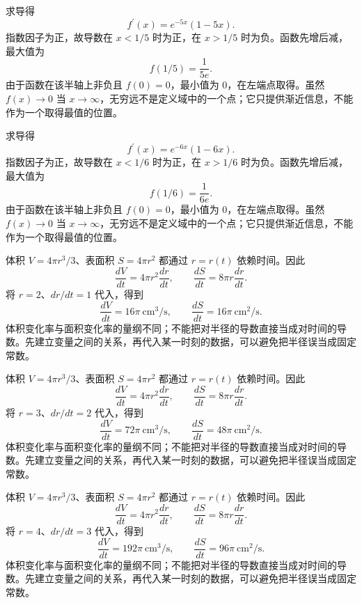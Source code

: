 \documentclass[12pt,fontset=fandol]{ctexart}
\begin{document}
\begin{solve}\label{ans:c11q18}
求导得
\[
f^{\prime}(x)=e^{-5x}(1-5x).
\]
指数因子为正，故导数在 $x<1/5$ 时为正，在 $x>1/5$ 时为负。函数先增后减，最大值为
\[
f(1/5)=\frac1{5e}.
\]
由于函数在该半轴上非负且 $f(0)=0$，最小值为 $0$，在左端点取得。虽然 $f(x)\to0$ 当 $x\to\infty$，无穷远不是定义域中的一个点；它只提供渐近信息，不能作为一个取得最值的位置。
\end{solve}

\begin{solve}\label{ans:c11q19}
求导得
\[
f^{\prime}(x)=e^{-6x}(1-6x).
\]
指数因子为正，故导数在 $x<1/6$ 时为正，在 $x>1/6$ 时为负。函数先增后减，最大值为
\[
f(1/6)=\frac1{6e}.
\]
由于函数在该半轴上非负且 $f(0)=0$，最小值为 $0$，在左端点取得。虽然 $f(x)\to0$ 当 $x\to\infty$，无穷远不是定义域中的一个点；它只提供渐近信息，不能作为一个取得最值的位置。
\end{solve}

\begin{solve}\label{ans:c11q20}
体积 $V=4\pi r^3/3$、表面积 $S=4\pi r^2$ 都通过 $r=r(t)$ 依赖时间。因此
\[
\frac{dV}{dt}=4\pi r^2\frac{dr}{dt},\qquad\frac{dS}{dt}=8\pi r\frac{dr}{dt}.
\]
将 $r=2$、$dr/dt=1$ 代入，得到
\[
\frac{dV}{dt}=16\pi\ \mathrm{cm}^3/\mathrm{s},\qquad\frac{dS}{dt}=16\pi\ \mathrm{cm}^2/\mathrm{s}.
\]
体积变化率与面积变化率的量纲不同；不能把对半径的导数直接当成对时间的导数。先建立变量之间的关系，再代入某一时刻的数据，可以避免把半径误当成固定常数。
\end{solve}

\begin{solve}\label{ans:c11q21}
体积 $V=4\pi r^3/3$、表面积 $S=4\pi r^2$ 都通过 $r=r(t)$ 依赖时间。因此
\[
\frac{dV}{dt}=4\pi r^2\frac{dr}{dt},\qquad\frac{dS}{dt}=8\pi r\frac{dr}{dt}.
\]
将 $r=3$、$dr/dt=2$ 代入，得到
\[
\frac{dV}{dt}=72\pi\ \mathrm{cm}^3/\mathrm{s},\qquad\frac{dS}{dt}=48\pi\ \mathrm{cm}^2/\mathrm{s}.
\]
体积变化率与面积变化率的量纲不同；不能把对半径的导数直接当成对时间的导数。先建立变量之间的关系，再代入某一时刻的数据，可以避免把半径误当成固定常数。
\end{solve}

\begin{solve}\label{ans:c11q22}
体积 $V=4\pi r^3/3$、表面积 $S=4\pi r^2$ 都通过 $r=r(t)$ 依赖时间。因此
\[
\frac{dV}{dt}=4\pi r^2\frac{dr}{dt},\qquad\frac{dS}{dt}=8\pi r\frac{dr}{dt}.
\]
将 $r=4$、$dr/dt=3$ 代入，得到
\[
\frac{dV}{dt}=192\pi\ \mathrm{cm}^3/\mathrm{s},\qquad\frac{dS}{dt}=96\pi\ \mathrm{cm}^2/\mathrm{s}.
\]
体积变化率与面积变化率的量纲不同；不能把对半径的导数直接当成对时间的导数。先建立变量之间的关系，再代入某一时刻的数据，可以避免把半径误当成固定常数。
\end{solve}
\end{document}
